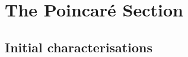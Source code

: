 \section{The Poincaré Section} \label{sec:Poincare}









    














\subsection{Initial characterisations}












